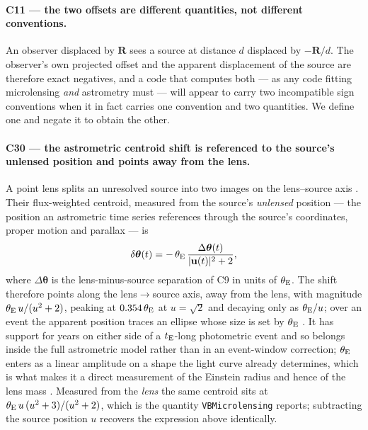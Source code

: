 \paragraph{C11 --- the two offsets are different quantities, not different
conventions.}  An observer displaced by $\mathbf{R}$ sees a source at
distance $d$ displaced by $-\mathbf{R}/d$.  The observer's own projected
offset and the apparent displacement of the source are therefore exact
negatives, and a code that computes both --- as any code fitting
microlensing \emph{and} astrometry must --- will appear to carry two
incompatible sign conventions when it in fact carries one convention and two
quantities.  We define one and negate it to obtain the other.

\paragraph{C30 --- the astrometric centroid shift is referenced to the
source's unlensed position and points away from the lens.}  A point lens
splits an unresolved source into two images on the lens--source axis
\citep{Walker:1995, Hog:1995, Miyamoto:1995}.  Their flux-weighted centroid,
measured from the source's \emph{unlensed} position --- the position an
astrometric time series references through the source's coordinates, proper
motion and parallax --- is
\begin{equation}
  \delta\boldsymbol{\theta}(t) = -\,\theta_{\rm E}\,
  \frac{\Delta\boldsymbol{\theta}(t)}{|\mathbf{u}(t)|^2 + 2},
\end{equation}
where $\Delta\boldsymbol{\theta}$ is the lens-minus-source separation of C9
in units of $\theta_{\rm E}$.  The shift therefore points along the
lens$\rightarrow$source axis, away from the lens, with magnitude
$\theta_{\rm E}\,u/(u^2+2)$, peaking at $0.354\,\theta_{\rm E}$ at
$u = \sqrt{2}$ and decaying only as $\theta_{\rm E}/u$; over an event the
apparent position traces an ellipse whose size is set by $\theta_{\rm E}$
\citep{Walker:1995, Hog:1995}.  It has support for years on either side of
a $t_{\rm E}$-long photometric event and so belongs inside the full
astrometric model rather than in an event-window correction; $\theta_{\rm
E}$ enters as a linear amplitude on a shape the light curve already
determines, which is what makes it a direct measurement of the Einstein
radius and hence of the lens mass \citep{Miyamoto:1995, Dominik:2000}.
Measured from the \emph{lens} the same
centroid sits at $\theta_{\rm E}\,u\,(u^2+3)/(u^2+2)$, which is the quantity
\texttt{VBMicrolensing} reports; subtracting the source position $u$
recovers the expression above identically.

